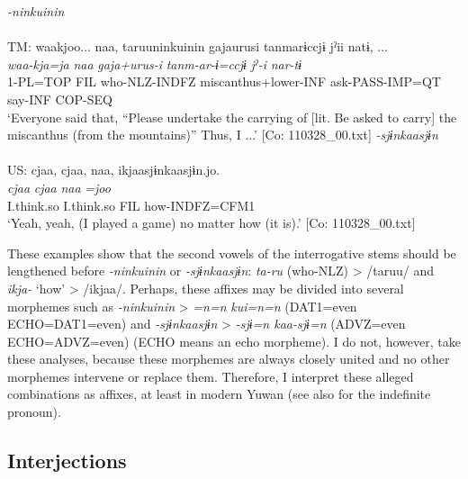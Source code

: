 \ea  \label{ex:4.55}
\ea  \textit{{}-ninkuinin} \label{ex:4.55a}\\\\
    TM:  
     \glll waakjoo...  naa,  taruuninkuinin  gajaurusi   tanmarɨccjɨ  jˀii  natɨ, ...\\
      \textit{waa-kja=ja}  \textit{naa}  \textit{}  \textit{gaja+urus-i} \textit{tanm-ar-ɨ=ccjɨ}  \textit{jˀ-i}  \textit{nar-tɨ}\\                                                                                        
      1-PL=TOP  FIL  who-NLZ-INDFZ  miscanthus+lower-INF                                ask-PASS-IMP=QT  say-INF  COP-SEQ\\
      \glt ‘Everyone said that, “Please undertake the carrying of [lit. Be asked to carry] the miscanthus (from the mountains)” Thus, I ...’   [Co: 110328\_00.txt]
\ex  \textit{{}-sjɨnkaasjɨn}\\\\
US: \glll     cjaa,  cjaa,  naa,  ikjaasjɨnkaasjɨn.jo.\\
      \textit{cjaa}  \textit{cjaa}  \textit{naa}  \textit{=joo}\\
      I.think.so  I.think.so  FIL  how-INDFZ=CFM1\\
      \glt       ‘Yeah, yeah, (I played a game) no matter how (it is).’ [Co: 110328\_00.txt]
    \z
\z

These examples show that the second vowels of the interrogative stems should be lengthened before \textit{{}-ninkuinin} or \textit{{}-sjɨnkaasjɨn}: \textit{ta-ru} (who-NLZ) > /taruu/ and \textit{ikja-} ‘how’ > /ikjaa/. Perhaps, these affixes may be divided into several morphemes such as \textit{{}-ninkuinin} > \textit{=n=n} \textit{kui=n=n} (DAT1=even ECHO=DAT1=even) and \textit{{}-sjɨnkaasjɨn} > \textit{{}-sjɨ=n kaa-sjɨ=n} (ADVZ=even ECHO=ADVZ=even) (ECHO means an echo morpheme). I do not, however, take these analyses, because these morphemes are always closely united and no other morphemes intervene or replace them. Therefore, I interpret these alleged combinations as affixes, at least in modern Yuwan (see also  for the indefinite pronoun).

\subsection{Interjections}\label{sec:4.3.7}


